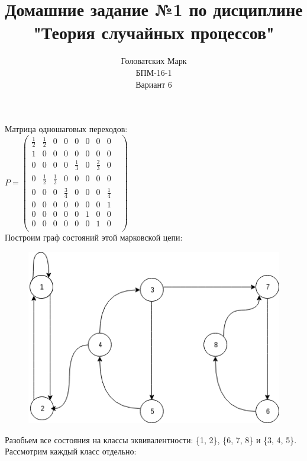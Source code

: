 \documentclass [a4paper,12pt]{article}
\title{Домашние задание №1 по дисциплине "Теория случайных процессов"}
\author{Головатских Марк \\БПМ-16-1 \\ Вариант 6}
\date{}
\begin{document}
\maketitle
{}
\newpage
{}
Матрица одношаговых переходов:\\

$P = \left(
\begin{matrix}
\frac{1}{2} & \frac{1}{2} & 0 & 0&0&0&0&0\\
1 & 0 & 0 & 0&0&0&0&0&\\
0 & 0 & 0 & 0&\frac{1}{3}&0&\frac{2}{3}&0\\
0 & \frac{1}{2} & \frac{1}{2} & 0&0&0&0&0\\
0 & 0 & 0 & \frac{3}{4}&0&0&0&\frac{1}{4}\\
0 & 0 & 0 & 0&0&0&0&1\\
0 & 0 & 0 & 0&0&1&0&0\\
0 & 0 & 0 & 0&0&0&1&0\\
\end{matrix}
\right) $\\

Построим граф состояний этой марковской цепи:\\

\begin{figure}[h!]
  \includegraphics[width=\linewidth]{hw1.png}
\end{figure}
Разобьем все состояния на классы эквивалентности:
\{1, 2\}, \{6, 7, 8\} и \{3, 4, 5\}.\\
Рассмотрим каждый класс отдельно:\\
\end{document}
